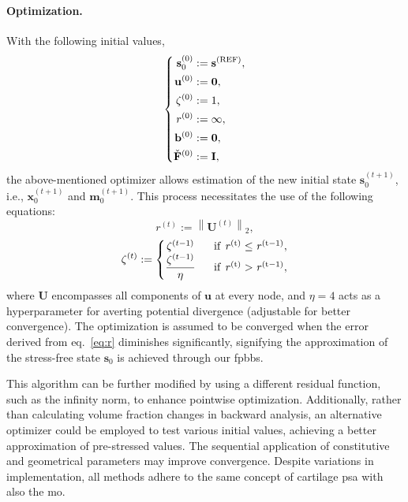 \documentclass[12pt,a4paper]{report}
\begin{document}
\paragraph{Optimization.} With the following initial values,
%
\begin{equation}
\left\{
\begin{aligned}
    \mathbf{s}_{0}^{(0)} &:= \mathbf{s}^{\rm{(REF)}}, \\
    \mathbf{u}^{(0)} &:= \mathbf{0}, \\
    \zeta^{(0)} &:= 1, \\
    r^{(0)} &:= \infty, \\
    \mathbf{b}^{(0)} &:= \mathbf{0}, \\
    \check{\mathbf{F}}^{(0)} &:= \mathbf{I},
\end{aligned}
\right.
\end{equation}
%
the above-mentioned optimizer allows estimation of the new initial state $\mathbf{s}_{0}^{(t+1)}$, i.e., $\mathbf{x}_{0}^{(t+1)}$ and $\mathbf{m}_{0}^{(t+1)}$. This process necessitates the use of the following equations:
%
\begin{equation}\label{eq:r}
    r^{(t)} := \left \| \mathbf{U}^{(t)} \right \|_2,
\end{equation}
%
\begin{equation}
    \zeta^{(t)} := \left\{\begin{matrix}
    \zeta^{(t-1)}  & \ \ \rm{if} \ \mathit{r}^{(t)} \leq \mathit{r}^{(t-1)},\\ 
    \displaystyle \frac{\zeta^{(t-1)}}{\eta} & \ \ \rm{if} \ \mathit{r}^{(t)} > \mathit{r}^{(t-1)},
    \end{matrix}\right.
\end{equation}
%
where $\mathbf{U}$ encompasses all components of $\mathbf{u}$ at every node, and $\eta=4$ acts as a hyperparameter for averting potential divergence (adjustable for better convergence). The optimization is assumed to be converged when the error derived from eq.~\ref{eq:r} diminishes significantly, signifying the approximation of the stress-free state $\mathbf{s}_0$ is achieved through our \ac{fpbbs}.

This algorithm can be further modified by using a different residual function, such as the infinity norm, to enhance pointwise optimization. Additionally, rather than calculating volume fraction changes in backward analysis, an alternative optimizer could be employed to test various initial values, achieving a better approximation of pre-stressed values. The sequential application of constitutive and geometrical parameters may improve convergence. Despite variations in implementation, all methods adhere to the same concept of cartilage \ac{psa} with also the \ac{mo}.
\end{document}
